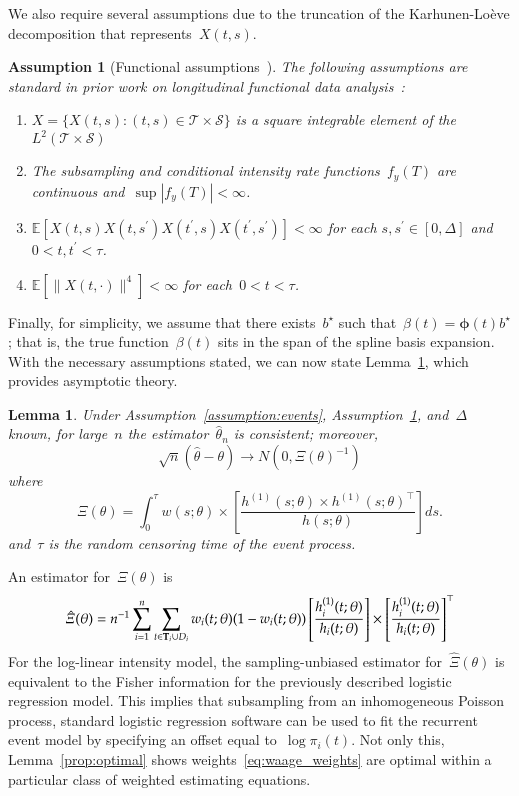\documentclass[11pt]{amsart}
\def\E{\mathcal{E}}
\newtheorem{lemma}[thm]{Lemma}
\newtheorem{assumption}[thm]{Assumption}
\def\E{\mathbb{E}}
\def\bfT{{\bf T}}
\begin{document}
We also require several assumptions due to the truncation of the Karhunen-Lo{\`e}ve decomposition that represents~$X(t,s)$.
\begin{assumption}[Functional assumptions~\citep{Park2018}] \normalfont
\label{assumption:truncation}
The following assumptions are standard in prior work on longitudinal functional data analysis~\citep{Park2018, Yao2005, ChenMuller2012}:
\begin{enumerate}[label=(A.\arabic*)]
\item\label{A1} $X = \{ X(t, s) : (t,s) \in \mathcal{T} \times
  \mathcal{S} \}$ is a square integrable element of the $L^2 (
  \mathcal{T} \times \mathcal{S})$
\item\label{A2} The subsampling and conditional intensity rate functions~$f_y(T)$ are continuous and~$\sup |f_y(T)| < \infty$.
\item\label{A3} $\E[X(t,s) X(t,s^\prime) X(t^\prime,s) X(t^\prime, s^\prime) ] < \infty$ for each $s,s^\prime \in [0,\Delta]$ and~$0 < t, t^\prime < \tau$.
\item\label{A4} $\E[\|X(t,\cdot)\|^4] < \infty$ for each~$0< t < \tau$.
\end{enumerate}
\end{assumption}
Finally, for simplicity, we assume that there exists~$b^\star$ such that~$\beta(t) = \mathbold{\phi} (t) b^\star$; that is, the true function~$\beta(t)$ sits in the span of the spline basis expansion. With the necessary assumptions stated, we can now state Lemma~\ref{lemma:simpleasym}, which provides asymptotic theory.

\begin{lemma} \normalfont
\label{lemma:simpleasym}
Under Assumption~\ref{assumption:events}, Assumption~\ref{assumption:truncation}, and~$\Delta$ known, for large~$n$ the estimator~$\hat \theta_n$ is consistent; moreover,
\[
\sqrt{n} (\hat \theta - \theta) \to N(0, \Xi (\theta)^{-1})
\]
where
\[
  \Xi (\theta) = \int_{0}^{\tau} w(s; \theta) \times \left[ \frac{h^{(1)}(s;
      \theta) \times  h^{(1)} (s;\theta)^{\top}}{h(s; \theta)} \right]
  ds.
\]
and~$\tau$ is the random censoring time of the event process.
\end{lemma}
An estimator for~$\Xi(\theta)$ is
\begin{equation}
\label{eq:fisher}
  \hat \Xi (\theta) = n^{-1} \sum_{i=1}^n \sum_{t \in \bfT_i \cup D_i}
  w_i(t;\theta) (1-w_i(t;\theta)) \left[ \frac{h_i^{(1)}(t;
      \theta)}{h_i (t; \theta)} \right] \times  \left [
    \frac{h_i^{(1)} (t;\theta)}{h_i(t; \theta)} \right]^\top
\end{equation}
For the log-linear intensity model, the sampling-unbiased estimator for~$\hat \Xi(\theta)$ is equivalent to the Fisher information for the previously described logistic regression model.
This implies that subsampling from an inhomogeneous Poisson process, standard logistic regression software can be used to fit the recurrent event model by specifying an offset equal to~$\log \pi_i (t)$. Not only this, Lemma~\ref{prop:optimal} shows weights~\eqref{eq:waage_weights} are optimal within a particular class of weighted estimating equations.
\end{document}
